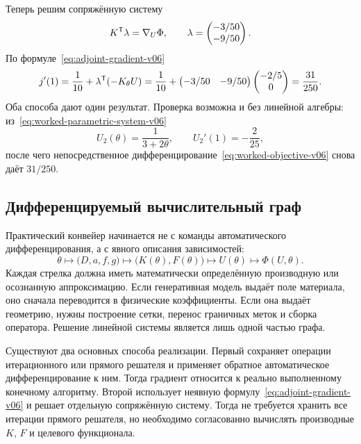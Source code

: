 Теперь решим сопряжённую систему
\begin{equation}
\label{eq:worked-adjoint-v06}
 K^{\mathsf{T}}\lambda
 =
 \nabla_U\Phi,
 \qquad
 \lambda
 =
 \begin{pmatrix}
 -3/50\\-9/50
 \end{pmatrix}.
\end{equation}
По формуле~\eqref{eq:adjoint-gradient-v06}
\begin{equation}
\label{eq:worked-adjoint-gradient-v06}
 j'(1)
 =
 \frac1{10}
 +
 \lambda^{\mathsf{T}}(-K_\theta U)
 =
 \frac1{10}
 +
 \begin{pmatrix}-3/50&-9/50\end{pmatrix}
 \begin{pmatrix}-2/5\\0\end{pmatrix}
 =
 \frac{31}{250}.
\end{equation}
Оба способа дают один результат. Проверка возможна и без линейной алгебры: из~\eqref{eq:worked-parametric-system-v06}
\[
 U_2(\theta)=\frac{1}{3+2\theta},
 \qquad
 U_2'(1)=-\frac{2}{25},
\]
после чего непосредственное дифференцирование~\eqref{eq:worked-objective-v06} снова даёт $31/250$.

\subsection{Дифференцируемый вычислительный граф}

Практический конвейер начинается не с команды автоматического дифференцирования, а с явного описания зависимостей:
\[
 \theta
 \longmapsto
 \bigl(D,a,f,g\bigr)
 \longmapsto
 \bigl(K(\theta),F(\theta)\bigr)
 \longmapsto
 U(\theta)
 \longmapsto
 \Phi(U,\theta).
\]
Каждая стрелка должна иметь математически определённую производную или осознанную аппроксимацию. Если генеративная модель выдаёт поле материала, оно сначала переводится в физические коэффициенты. Если она выдаёт геометрию, нужны построение сетки, перенос граничных меток и сборка оператора. Решение линейной системы является лишь одной частью графа.

Существуют два основных способа реализации. Первый сохраняет операции итерационного или прямого решателя и применяет обратное автоматическое дифференцирование к ним. Тогда градиент относится к реально выполненному конечному алгоритму. Второй использует неявную формулу~\eqref{eq:adjoint-gradient-v06} и решает отдельную сопряжённую систему. Тогда не требуется хранить все итерации прямого решателя, но необходимо согласованно вычислять производные $K$, $F$ и целевого функционала.

